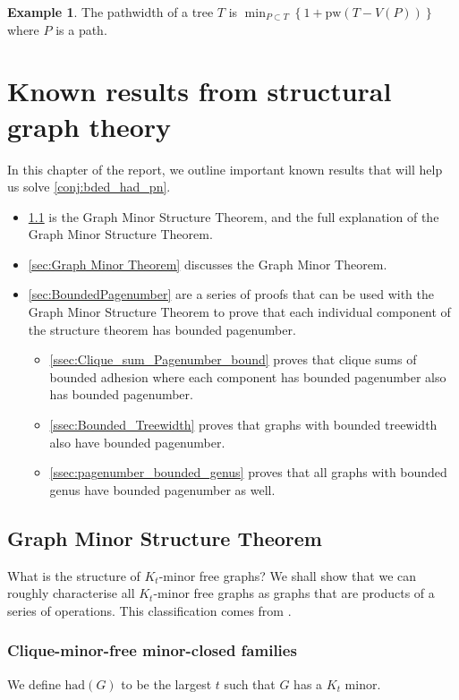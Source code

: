\documentclass[]{report}
\newcommand{\had}{\text{had}}
\newcommand{\pw}{\text{pw}}
\theoremstyle{definition}
\newtheorem{example}[theorem]{Example}
\numberwithin{theorem}{section}
\numberwithin{equation}{section}
\begin{document}
\begin{example}
	The pathwidth of a tree $T$ is $\min_{P \subset T} \left\lbrace 1 + \pw(T - V(P))\right\rbrace $ where $P$ is a path. 
\end{example}

\chapter{Known results from structural graph theory}\label{chap:Known results}
In this chapter of the report, we outline important known results that will help us solve \cref{conj:bded_had_pn}.

\begin{itemize}
	\item \cref{sec:Kt_Minor_Free} is the Graph Minor Structure Theorem, and the full explanation of the Graph Minor Structure Theorem.
	\item \cref{sec:Graph Minor Theorem} discusses the Graph Minor Theorem. 
	\item \cref{sec:BoundedPagenumber} are a series of proofs that can be used with the Graph Minor Structure Theorem to prove that each individual component of the structure theorem has bounded pagenumber.
	\begin{itemize}
		\item \cref{ssec:Clique_sum_Pagenumber_bound} proves that clique sums of bounded adhesion where each component has bounded pagenumber also has bounded pagenumber.
		\item \cref{ssec:Bounded_Treewidth} proves that graphs with bounded treewidth also have bounded pagenumber.
		\item \cref{ssec:pagenumber_bounded_genus} proves that all graphs with bounded genus have bounded pagenumber as well.
	\end{itemize}
\end{itemize}

\section{Graph Minor Structure Theorem}\label{sec:Kt_Minor_Free}
What is the structure of $K_t$-minor free graphs? We shall show that we can roughly characterise all $K_t$-minor free graphs as graphs that are products of a series of operations. This classification comes from \cite{robertsonGraphMinorsXVI2003}.
\subsection{Clique-minor-free minor-closed families}\label{ssec:Kt_Minor_Closed_families}
We define $\had(G)$ to be the largest $t$ such that $G$ has a $K_t$ minor. 
\end{document}
